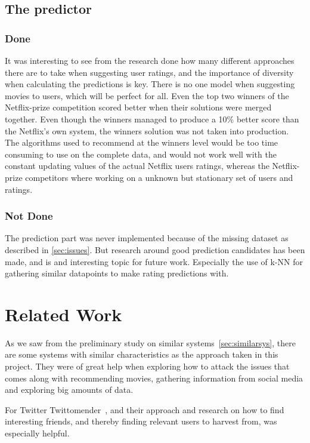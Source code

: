 \subsection{The predictor}
\subsubsection{Done}
It was interesting to see from the research done how many different approaches there are to take when suggesting user ratings, and the importance of diversity when calculating the predictions is key. There is no one model when suggesting movies to users, which will be perfect for all. Even the top two winners of the Netflix-prize competition scored better when their solutions were merged together. Even though the winners managed to produce a 10\% better score than the Netflix's own system, the winners solution was not taken into production. The algorithms used to recommend at the winners level would be too time consuming to use on the complete data, and would not work well with the constant updating values of the actual Netflix users ratings, whereas the Netflix-prize competitors where working on a unknown but stationary set of users and ratings.

\subsubsection{Not Done}
The prediction part was never implemented because of the missing dataset as described in \ref{sec:issues}. But research around good prediction candidates has been made, and is and interesting topic for future work. Especially the use of k-NN for gathering similar datapoints to make rating predictions with.





\section{Related Work}
As we saw from the preliminary study on similar systems~\ref{sec:similarsys}, there are some systems with similar characteristics as the approach taken in this project. They were of great help when exploring how to attack the issues that comes along with recommending movies, gathering information from social media and exploring big amounts of data.

For Twitter Twittomender~\cite{twittomender}, and their approach and research on how to find interesting friends, and thereby finding relevant users to harvest from, was especially helpful.

